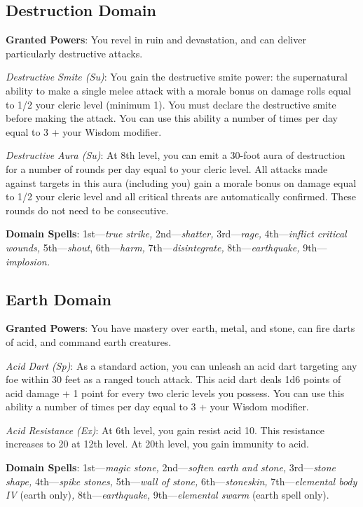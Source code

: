 \subsection{Destruction Domain}

				
\textbf{Granted Powers}: You revel in ruin and devastation, and can deliver particularly destructive attacks.
				
\textit{Destructive Smite (Su)}: You gain the destructive smite power: the supernatural ability to make a single melee attack with a morale bonus on damage rolls equal to 1/2 your cleric level (minimum 1). You must declare the destructive smite before making the attack. You can use this ability a number of times per day equal to 3 + your Wisdom modifier.
				
\textit{Destructive Aura (Su)}: At 8th level, you can emit a 30-foot aura of destruction for a number of rounds per day equal to your cleric level. All attacks made against targets in this aura (including you) gain a morale bonus on damage equal to 1/2 your cleric level and all critical threats are automatically confirmed. These rounds do not need to be consecutive.
				
\textbf{Domain Spells}: 1st---\textit{true strike, }2nd---\textit{shatter, }3rd---\textit{rage, }4th---\textit{inflict critical wounds, }5th---\textit{shout}, 6th---\textit{harm, }7th---\textit{disintegrate, }8th---\textit{earthquake, }9th---\textit{implosion.}
				
\subsection{Earth Domain}

				
\textbf{Granted Powers}: You have mastery over earth, metal, and stone, can fire darts of acid, and command earth creatures.
				
\textit{Acid Dart (Sp)}: As a standard action, you can unleash an acid dart targeting any foe within 30 feet as a ranged touch attack. This acid dart deals 1d6 points of acid damage + 1 point for every two cleric levels you possess. You can use this ability a number of times per day equal to 3 + your Wisdom modifier. 
				
\textit{Acid Resistance (Ex)}: At 6th level, you gain resist acid 10. This resistance increases to 20 at 12th level. At 20th level, you gain immunity to acid.
				
\textbf{Domain Spells}: 1st---\textit{magic stone, }2nd---\textit{soften earth and stone, }3rd---\textit{stone shape, }4th---\textit{spike stones, }5th---\textit{wall of stone, }6th---\textit{stoneskin, }7th---\textit{elemental body IV }(earth only)\textit{, }8th---\textit{earthquake, }9th---\textit{elemental swarm }(earth spell only).
				
